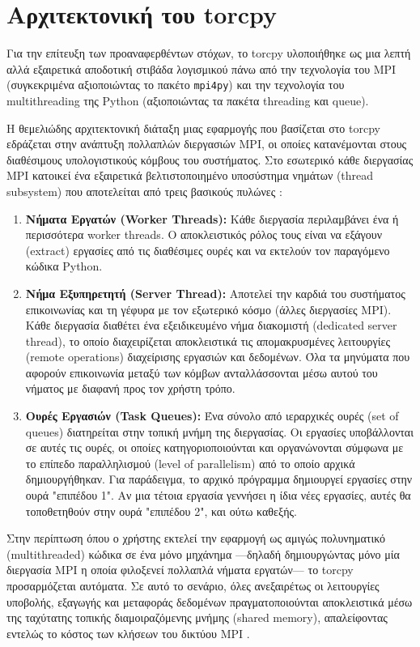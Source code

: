 \section{Αρχιτεκτονική του torcpy}

Για την επίτευξη των προαναφερθέντων στόχων, το torcpy υλοποιήθηκε ως μια λεπτή αλλά 
εξαιρετικά αποδοτική στιβάδα λογισμικού πάνω από την τεχνολογία του MPI (συγκεκριμένα 
αξιοποιώντας το πακέτο \texttt{mpi4py}) και την τεχνολογία του multithreading της Python 
(αξιοποιώντας τα πακέτα threading και queue).

Η θεμελιώδης αρχιτεκτονική διάταξη μιας εφαρμογής που βασίζεται στο torcpy εδράζεται στην ανάπτυξη πολλαπλών διεργασιών MPI, οι οποίες κατανέμονται στους διαθέσιμους 
υπολογιστικούς κόμβους του συστήματος. Στο εσωτερικό κάθε διεργασίας MPI κατοικεί ένα εξαιρετικά βελτιστοποιημένο υποσύστημα νημάτων (thread subsystem) που αποτελείται από τρεις βασικούς πυλώνες \cite{hadjidoukas2020torcpy}:

\begin{enumerate}
    \item \textbf{Νήματα Εργατών (Worker Threads):}  Κάθε διεργασία περιλαμβάνει ένα ή περισσότερα worker threads. Ο αποκλειστικός ρόλος τους είναι να εξάγουν (extract) εργασίες από τις διαθέσιμες ουρές και να εκτελούν τον παραγόμενο κώδικα Python. 
    \item \textbf{Νήμα Εξυπηρετητή (Server Thread):} Αποτελεί την καρδιά του συστήματος επικοινωνίας και τη γέφυρα με τον εξωτερικό κόσμο (άλλες διεργασίες MPI). Κάθε 
    διεργασία διαθέτει ένα εξειδικευμένο νήμα διακομιστή (dedicated server thread), το οποίο διαχειρίζεται αποκλειστικά τις απομακρυσμένες λειτουργίες (remote operations) 
    διαχείρισης εργασιών και δεδομένων. Όλα τα μηνύματα που αφορούν επικοινωνία μεταξύ 
    των κόμβων ανταλλάσσονται μέσω αυτού του νήματος με διαφανή προς τον χρήστη τρόπο.
    \item \textbf{Ουρές Εργασιών (Task Queues):} Ένα σύνολο από ιεραρχικές ουρές (set of queues) διατηρείται στην τοπική μνήμη της διεργασίας. Οι εργασίες υποβάλλονται σε αυτές τις ουρές, οι οποίες κατηγοριοποιούνται και οργανώνονται σύμφωνα με το επίπεδο παραλληλισμού (level of parallelism) από το οποίο αρχικά δημιουργήθηκαν. Για παράδειγμα, το αρχικό πρόγραμμα δημιουργεί εργασίες στην ουρά "επιπέδου 1". Αν μια τέτοια εργασία γεννήσει η ίδια νέες εργασίες, αυτές θα τοποθετηθούν στην ουρά "επιπέδου 2", και ούτω καθεξής.
\end{enumerate}

Στην περίπτωση όπου ο χρήστης εκτελεί την εφαρμογή ως αμιγώς πολυνηματικό 
(multithreaded) κώδικα σε ένα μόνο μηχάνημα —δηλαδή δημιουργώντας μόνο μία διεργασία 
MPI η οποία φιλοξενεί πολλαπλά νήματα εργατών— το torcpy προσαρμόζεται αυτόματα. Σε 
αυτό το σενάριο, όλες ανεξαιρέτως οι λειτουργίες υποβολής, εξαγωγής και μεταφοράς 
δεδομένων πραγματοποιούνται αποκλειστικά μέσω της ταχύτατης τοπικής διαμοιραζόμενης 
μνήμης (shared memory), απαλείφοντας εντελώς το κόστος των κλήσεων του δικτύου MPI \cite{hadjidoukas2020torcpy}.

